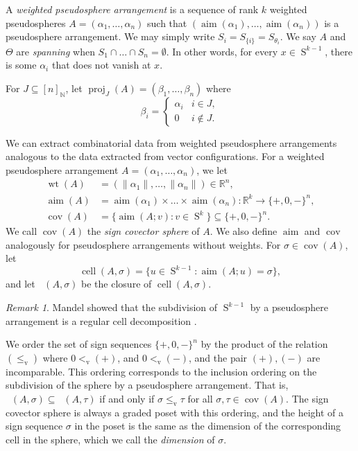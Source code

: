 \documentclass[11pt]{article}
\numberwithin{equation}{section}
\theoremstyle{remark}
\newtheorem{remark}[theorem]{Remark}
\let\mb\mathbb
\let\df\emph
\newcommand{\vv}{{\vvv}}
\DeclareMathOperator{\vvv}{v}
\DeclareMathOperator{\wei}{wt}
\DeclareMathOperator{\sphere}{S}
\DeclareMathOperator{\cell}{cell}
\DeclareMathOperator{\Cell}{\overline{cell}}
\DeclareMathOperator{\aim}{aim}
\DeclareMathOperator{\proj}{proj}
\DeclareMathOperator{\cov}{cov}
\begin{document}
A \df{weighted pseudosphere arrangement} is a sequence of rank $k$ weighted pseudospheres ${A} = (\alpha_1,\dots,\alpha_n)$ such that $(\aim(\alpha_1),\dots,\aim(\alpha_n))$ is a pseudosphere arrangement.
We may simply write $S_i = S_{\{i\}} = S_{\theta_i}$.
We say $A$ and $\Theta$ are \df{spanning} when $S_{1} \cap \dots \cap S_{n} = \emptyset$. In other words, for every $x \in \sphere^{k-1}$, there is some $\alpha_i$ that does not vanish at $x$.

For $J \subseteq [n]_\mb{N}$, let $\proj_J(A) = (\beta_1,\dots,\beta_n)$ where
\[\beta_i =
\begin{cases} \alpha_i & i\in J, \\ 0 & i \not\in J .\end{cases} \]

We can extract combinatorial data from weighted pseudosphere arrangements analogous to the data extracted from vector configurations.
For a weighted pseudosphere arrangement $A = (\alpha_1,\dots,\alpha_n)$,
we let
\begin{align*}
\wei(A) &= (\|\alpha_1\|,\dots,\|\alpha_n\|) \in \mb{R}^n, \\
\aim (A) &= \aim(\alpha_1)\times \dots\times \aim(\alpha_n) : \mb{R}^k \to \{+,0,-\}^n, \\
\cov (A) &= \bigl\{ \aim (A; v) :v \in \sphere^{k} \bigr\} \subseteq \{+,0,-\}^n.
\end{align*}
We call $\cov (A)$ the \df{sign covector sphere} of $A$.
We also define $\aim$ and $\cov$ analogously for pseudosphere arrangements without weights.
For $\sigma \in \cov (A)$, let
\[ \cell(A,\sigma) = \bigl\{u \in \sphere^{k-1}:\aim (A; u) = \sigma \bigr\}, \]
and let $\Cell(A,\sigma)$ be the closure of $\cell(A,\sigma)$.

\begin{remark}\label{remark-cell}
Mandel showed that the subdivision of $\sphere^{k-1}$ by a pseudosphere arrangement is a regular cell decomposition \cite{edmonds1978topology}.
\end{remark}

We order the set of sign sequences $\{+,0,-\}^n$ by the product of the relation $(\leq_\vv)$ where ${0 <_\vv ({+})}$, and ${0 <_\vv ({-})}$, and the pair $({+}),({-})$ are incomparable.
This ordering corresponds to the inclusion ordering on the subdivision of the sphere by a pseudosphere arrangement. That is, $\Cell(A,\sigma) \subseteq \Cell(A,\tau)$ if and only if $\sigma \leq_\vv \tau$ for all $\sigma,\tau \in \cov(A)$.
The sign covector sphere is always a graded poset with this ordering,
and the height of a sign sequence $\sigma$ in the poset is the same as the dimension of the corresponding cell in the sphere, which we call the \df{dimension} of $\sigma$.
\end{document}

